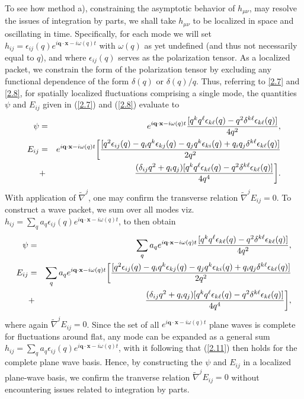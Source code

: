 To see how method a), constraining the asymptotic behavior of $h_{\mu\nu}$, may resolve the issues of integration by parts, we shall take $h_{\mu\nu}$  to be localized in space and oscillating in time. Specifically, for each mode we will set $h_{ij}=\epsilon_{ij}(q)e^{i\mathbf{q}\cdot\mathbf{x}-i\omega(q) t}$ with $\omega(q)$ as yet undefined (and thus not necessarily equal to $q$), and where $\epsilon_{ij}(q)$ serves as the polarization tensor. As a localized packet, we constrain the form of the polarization tensor by excluding any functional dependence of the form $\delta(q)$ or $\delta(q)/q$. Thus, referring to \eqref{2.7} and \eqref{2.8}, for spatially localized fluctuations comprising a single mode, the quantities $\psi$ and $E_{ij}$ given in (\ref{2.7}) and (\ref{2.8}) evaluate to
%
\begin{eqnarray}
\psi&=&e^{i\mathbf{q}\cdot\mathbf{x}-i\omega(q) t}\frac{[q^kq^{\ell}\epsilon_{k\ell}(q)-q^2\delta^{k\ell}\epsilon_{k\ell}(q)]}{4q^2},
\nonumber\\
E_{ij}&=&e^{i\mathbf{q}\cdot\mathbf{x}-i\omega(q) t}\bigg{[}\frac{[q^2\epsilon_{ij}(q)-q_iq^k\epsilon_{kj}(q)-q_jq^k\epsilon_{ki}(q)+q_iq_j\delta^{k\ell}\epsilon_{k\ell}(q)]}{2q^2}
\nonumber\\
&+&\frac{(\delta_{ij}q^2+q_iq_j)[q^kq^{\ell}\epsilon_{k\ell}(q)-q^2\delta^{k\ell}\epsilon_{k\ell}(q)]}{4q^4}\bigg{]}.
\label{2.10}
\end{eqnarray}
%
With application of $\tilde\nabla^j$, one may confirm the transverse relation $\tilde{\nabla}^jE_{ij}=0$. To construct a wave packet, we sum over all modes viz. $h_{ij}=\sum_qa_q\epsilon_{ij}(q)e^{i\mathbf{q}\cdot\mathbf{x}-i\omega(q) t}$, to then obtain
%
\begin{eqnarray}
\psi&=&\sum_qa_qe^{i\mathbf{q}\cdot\mathbf{x}-i\omega(q) t}\frac{[q^kq^{\ell}\epsilon_{k\ell}(q)-q^2\delta^{k\ell}\epsilon_{k\ell}(q)]}{4q^2},
\nonumber\\
E_{ij}&=&\sum_qa_qe^{i\mathbf{q}\cdot\mathbf{x}-i\omega(q) t}\bigg{[}\frac{[q^2\epsilon_{ij}(q)-q_iq^k\epsilon_{kj}(q)-q_jq^k\epsilon_{ki}(q)+q_iq_j\delta^{k\ell}\epsilon_{k\ell}(q)]}{2q^2}
\nonumber\\
&+&\frac{(\delta_{ij}q^2+q_iq_j)[q^kq^{\ell}\epsilon_{k\ell}(q)-q^2\delta^{k\ell}\epsilon_{k\ell}(q)]}{4q^4}\bigg{]},
\label{2.11}
\end{eqnarray}
%
where again $\tilde{\nabla}^jE_{ij}=0$. Since the set of all $e^{i\mathbf{q}\cdot\mathbf{x}-i\omega (q)t}$ plane waves is complete for fluctuations around flat, any mode can be expanded as a general sum $h_{ij}=\sum_qa_q\epsilon_{ij}(q)e^{i\mathbf{q}\cdot\mathbf{x}-i\omega(q) t}$, with it following that (\ref{2.11}) then holds for the complete plane wave basis. Hence, by constructing the $\psi$ and $E_{ij}$ in a localized plane-wave basis, we confirm the tranverse relation $\tilde\nabla^j E_{ij} = 0$ without encountering issues related to integration by parts.




